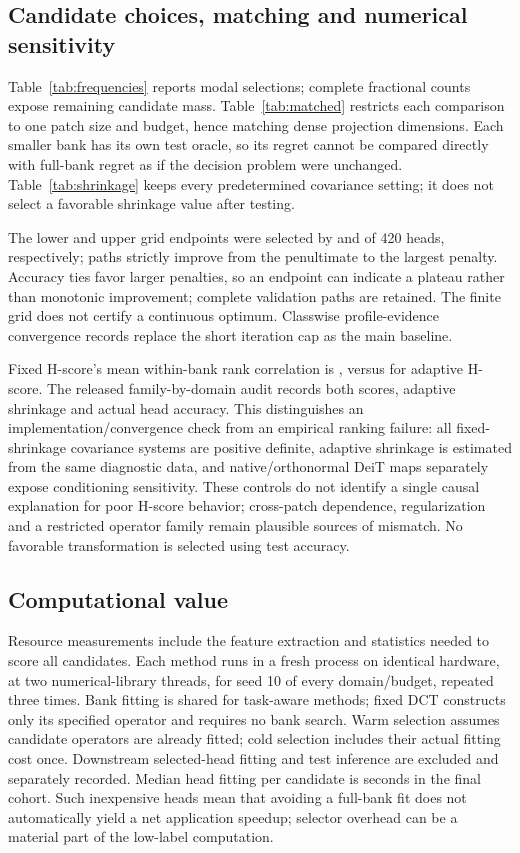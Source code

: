 \documentclass[11pt]{article}
\begin{document}
\subsection{Candidate choices, matching and numerical sensitivity}



Table~\ref{tab:frequencies} reports modal selections; complete fractional counts expose remaining candidate mass. Table~\ref{tab:matched} restricts each comparison to one patch size and budget, hence matching dense projection dimensions. Each smaller bank has its own test oracle, so its regret cannot be compared directly with full-bank regret as if the decision problem were unchanged. Table~\ref{tab:shrinkage} keeps every predetermined covariance setting; it does not select a favorable shrinkage value after testing.

The lower and upper grid endpoints were selected by \RevLowerGridCount{} and \RevUpperGridCount{} of 420 heads, respectively; \RevUpperImprovementCount{} paths strictly improve from the penultimate to the largest penalty. Accuracy ties favor larger penalties, so an endpoint can indicate a plateau rather than monotonic improvement; complete validation paths are retained. The finite grid does not certify a continuous optimum. Classwise profile-evidence convergence records replace the short iteration cap as the main baseline.

Fixed H-score's mean within-bank rank correlation is \RevHscoreRho{}, versus \RevAdaptiveRho{} for adaptive H-score. The released family-by-domain audit records both scores, adaptive shrinkage and actual head accuracy. This distinguishes an implementation/convergence check from an empirical ranking failure: all fixed-shrinkage covariance systems are positive definite, adaptive shrinkage is estimated from the same diagnostic data, and native/orthonormal DeiT maps separately expose conditioning sensitivity. These controls do not identify a single causal explanation for poor H-score behavior; cross-patch dependence, regularization and a restricted operator family remain plausible sources of mismatch. No favorable transformation is selected using test accuracy.

\subsection{Computational value}

Resource measurements include the feature extraction and statistics needed to score all candidates. Each method runs in a fresh process on identical hardware, at two numerical-library threads, for seed 10 of every domain/budget, repeated three times. Bank fitting is shared for task-aware methods; fixed DCT constructs only its specified operator and requires no bank search. Warm selection assumes candidate operators are already fitted; cold selection includes their actual fitting cost once. Downstream selected-head fitting and test inference are excluded and separately recorded. Median head fitting per candidate is \RevHeadSeconds{} seconds in the final cohort. Such inexpensive heads mean that avoiding a full-bank fit does not automatically yield a net application speedup; selector overhead can be a material part of the low-label computation.
\end{document}
